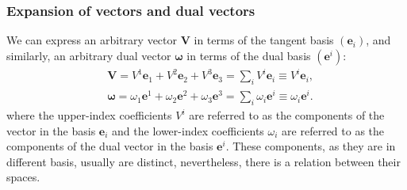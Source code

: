 \subsubsection{Expansion of vectors and dual vectors}
We can express an arbitrary vector $\bm V$ in terms of the tangent basis $(\bm e_i)$, and similarly, an arbitrary dual vector $\bm \omega$ in terms of the dual basis $(\bm e^i)$:
\begin{align}
\label{eqn:v}
&\bm V = V^1\bm e_1 + V^2\bm e_2 + V^3\bm e_3=\sum_i V^i\bm e_i\equiv V^i\bm e_i,\\
&\bm \omega = \omega_1\bm e^1 + \omega_2\bm e^2 + \omega_3\bm e^3=\sum_i \omega_i\bm e^i\equiv \omega_i\bm e^i.
\end{align}
where the upper-index coefficients $V^i$ are referred to as the components of the vector in the basis $\bm e_i$ and the lower-index coefficients $\omega_i$ are referred to as the components of the dual vector in the basis $\bm e^i$. These components, as they are in different basis, usually are distinct, nevertheless, there is a relation between their spaces.